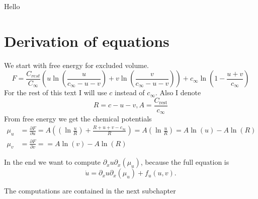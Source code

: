 \documentclass{article}
\begin{document}
	\tableofcontents
	Hello
	\section{Derivation of equations}
	We start with free energy for excluded volume. 
	\begin{equation}\label{free-energy}
		F=\frac{C_{rest}}{C_{\infty}}\left(u\ln\left(\frac{u}{c_{\infty}-u-v}\right)+v\ln\left(\frac{v}{c_{\infty}-u-v}\right)\right)+c_{\infty}\ln\left(1-\frac{u+v}{c_{\infty}}\right)
	\end{equation}
	For the rest of this text I will use $ c $ instead of $ c_{\infty} $. Also I denote
	\begin{equation}
		R = c-u-v, A = \frac{C_{\text{rest}}}{c_\infty}
	\end{equation}
	From free energy we get the chemical potentials
	\begin{align}
		\mu_{u}&=\frac{\partial F}{\partial u}=A\left(\left(\ln\frac{u}{R}\right)+\frac{R+u+v-c_{\infty}}{R}\right)=A\left(\ln\frac{u}{R}\right)= A \ln(u)-A\ln(R) \\
		\mu_{v}&=\frac{\partial F}{\partial v}= = A \ln(v)-A\ln(R)
	\end{align}
	
In the end we want to compute  $\partial_x u \partial_x(\mu_u)$, because the full equation is 
\begin{equation}
\dot{u} = \partial_x u \partial_x(\mu_u) + f_u(u,v).
\end{equation}

 
 
The computations are contained in the next subchapter
\end{document}
